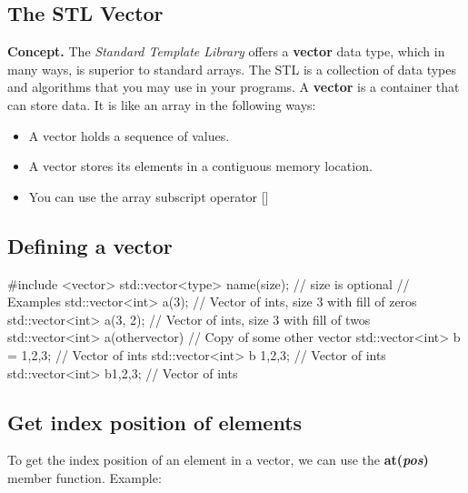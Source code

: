 \documentclass{report}
\begin{document}
    \pagebreak \bigbreak \noindent 
    \subsection{The STL Vector}
    \bigbreak \noindent 
    \textbf{Concept. } The \textit{Standard Template Library} offers a \textbf{vector} data type, which in many ways, is superior to standard arrays.
    \bigbreak \noindent 
    The STL is a collection of data types and algorithms that you may use in your programs. 
    \bigbreak \noindent 
    A \textbf{vector} is a container that can store data. It is like an array in the following ways:
    \begin{itemize}
        \item A vector holds a sequence of values.
        \item A vector stores its elements in a contiguous memory location.
        \item You can use the array subscript operator []
    \end{itemize}

    \bigbreak \noindent 
    \subsection{Defining a vector}
    \bigbreak \noindent 
    
    \begin{cppcode}
#include <vector>
std::vector<type> name(size); // size is optional 
// Examples
std::vector<int> a(3); // Vector of ints, size 3 with fill of zeros
std::vector<int> a(3, 2); // Vector of ints, size 3 with fill of twos
std::vector<int> a(othervector) // Copy of some other vector
std::vector<int> b = {1,2,3}; // Vector of ints
std::vector<int> b {1,2,3}; // Vector of ints
std::vector<int> b{1,2,3}; // Vector of ints
    \end{cppcode}
    
    \bigbreak \noindent 

    \bigbreak \noindent 
    \subsection{Get index position of elements}
    \bigbreak \noindent 
    To get the index position of an element in a vector, we can use the \textbf{at(\textit{pos})} member function.
    \bigbreak \noindent 
    Example:
    \bigbreak \noindent 
    
\end{document}

